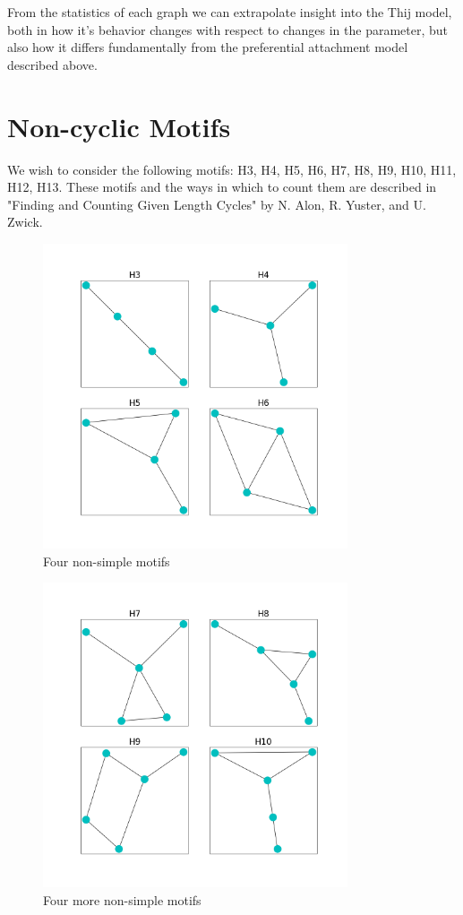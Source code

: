 From the statistics of each graph we can extrapolate insight into the Thij model, both 
in how it's behavior changes with respect to changes in the parameter, but also how
it differs fundamentally from the preferential attachment model described above.


\newpage

\section{Non-cyclic Motifs}

We wish to consider the following motifs: H3, H4, H5, H6, H7, H8, H9, H10, H11, H12, H13.
These motifs and the ways in which to count them are described in "Finding and Counting 
Given Length Cycles" by N. Alon, R. Yuster, and U. Zwick.

\vspace{3mm}

\begin{figure}[h!]
    \includegraphics[width=9cm]{Images/motif_set_one.png}
    \centering
    \caption{Four non-simple motifs}
\end{figure}

\begin{figure}[h!]
    \includegraphics[width=9cm]{Images/motif_set_two.png}
    \centering
    \caption{Four more non-simple motifs}
\end{figure}

